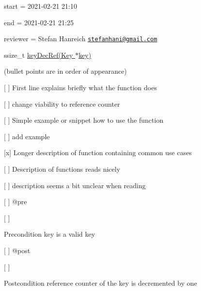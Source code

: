 
\begin{DoxyItemize}
\item start = 2021-\/02-\/21 21\+:10
\item end = 2021-\/02-\/21 21\+:25
\item reviewer = Stefan Hanreich \href{mailto:stefanhani@gmail.com}{\tt stefanhani@gmail.\+com}
\end{DoxyItemize}

{\ttfamily ssize\+\_\+t \hyperlink{group__key_ga2c6433ca22109e4e141946057eccb283}{key\+Dec\+Ref(\+Key $\ast$key)}}

(bullet points are in order of appearance)


\begin{DoxyItemize}
\item \mbox{[} \mbox{]} First line explains briefly what the function does
\begin{DoxyItemize}
\item \mbox{[} \mbox{]} change viability to reference counter
\end{DoxyItemize}
\item \mbox{[} \mbox{]} Simple example or snippet how to use the function
\begin{DoxyItemize}
\item \mbox{[} \mbox{]} add example
\end{DoxyItemize}
\item \mbox{[}x\mbox{]} Longer description of function containing common use cases
\item \mbox{[} \mbox{]} Description of functions reads nicely
\begin{DoxyItemize}
\item \mbox{[} \mbox{]} description seems a bit unclear when reading
\end{DoxyItemize}
\item \mbox{[} \mbox{]} {\ttfamily @pre}
\begin{DoxyItemize}
\item \mbox{[} \mbox{]} \begin{DoxyPrecond}{Precondition}
key is a valid key
\end{DoxyPrecond}

\end{DoxyItemize}
\item \mbox{[} \mbox{]} {\ttfamily @post}
\begin{DoxyItemize}
\item \mbox{[} \mbox{]} \begin{DoxyPostcond}{Postcondition}
reference counter of the key is decremented by one
\end{DoxyPostcond}


\end{DoxyItemize}
\end{DoxyItemize}
